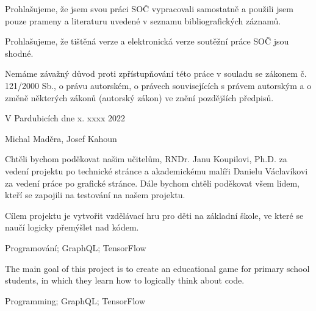 \noindent Prohlašujeme, že jsem svou práci SOČ vypracovali samostatně a použili jsem pouze prameny a literaturu uvedené v seznamu bibliografických záznamů.

\noindent Prohlašujeme, že tištěná verze a elektronická verze soutěžní práce SOČ jsou shodné. 

\noindent Nemáme závažný důvod proti zpřístupňování této práce v souladu se zákonem č. 121/2000 Sb., o právu autorském, o právech souvisejících s právem autorským a o změně některých zákonů (autorský zákon) ve znění pozdějších předpisů. 

\vspace{24 pt}

\noindent V Pardubicích dne x. xxxx 2022 \dotfill{} 

\hspace{6cm} Michal Maděra, Josef Kahoun

\cleardoublepage

\vspace*{0.8\textheight}

\noindent
Chtěli bychom poděkovat našim učitelům, RNDr. Janu Koupilovi, Ph.D. za vedení projektu po technické stránce a akademickému malíři Danielu Václavíkovi za vedení práce po grafické stránce. Dále bychom chtěli poděkovat všem lidem, kteří se zapojili na testování na našem projektu.

\cleardoublepage


\noindent Cílem projektu je vytvořit vzdělávací hru pro děti na základní škole, ve které se naučí logicky přemýšlet nad kódem.

\vspace{18pt}


\noindent Programování; GraphQL; TensorFlow 

\vspace{18pt}


\noindent The main goal of this project is to create an educational game for primary school students, in which they learn how to logically think about code.

\vspace{18pt}


\noindent Programming; GraphQL; TensorFlow

\cleardoublepage

\tableofcontents